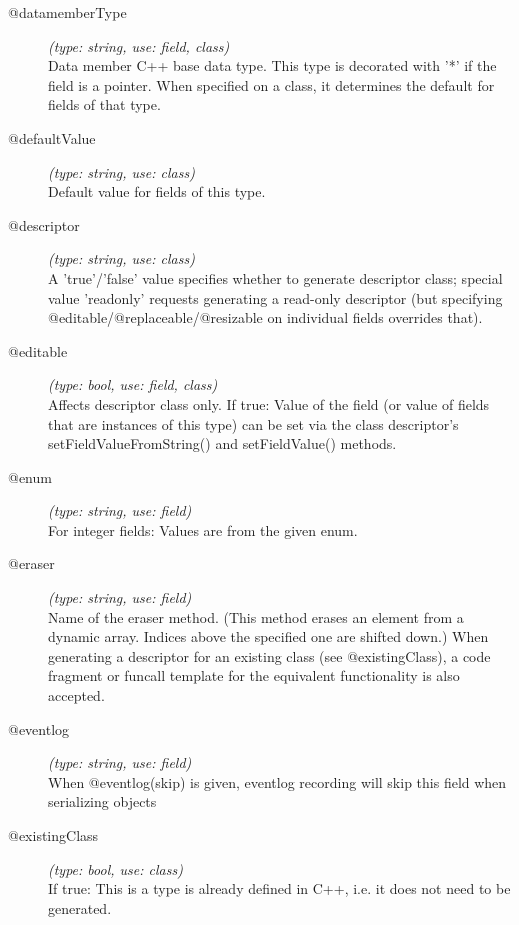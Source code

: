 \begin{description}
\item[@datamemberType] \textit{(type: string, use: field, class)} \\
  Data member C++ base data type. This type is decorated with '*' if the field
  is a pointer. When specified on a class, it determines the default for
  fields of that type.

\item[@defaultValue] \textit{(type: string, use: class)} \\
  Default value for fields of this type.

\item[@descriptor] \textit{(type: string, use: class)} \\
  A 'true'/'false' value specifies whether to generate descriptor class;
  special value 'readonly' requests generating a read-only descriptor (but
  specifying @editable/@replaceable/@resizable on individual fields overrides
  that).

\item[@editable] \textit{(type: bool, use: field, class)} \\
  Affects descriptor class only. If true: Value of the field (or value of
  fields that are instances of this type) can be set via the class
  descriptor's setFieldValueFromString() and setFieldValue() methods.

\item[@enum] \textit{(type: string, use: field)} \\
  For integer fields: Values are from the given enum.

\item[@eraser] \textit{(type: string, use: field)} \\
  Name of the eraser method. (This method erases an element from a dynamic
  array. Indices above the specified one are shifted down.) When generating a
  descriptor for an existing class (see @existingClass), a code fragment or
  funcall template for the equivalent functionality is also accepted.

\item[@eventlog] \textit{(type: string, use: field)} \\
  When @eventlog(skip) is given, eventlog recording will skip this field when
  serializing objects

\item[@existingClass] \textit{(type: bool, use: class)} \\
  If true: This is a type is already defined in C++, i.e. it does not need to
  be generated.


\end{description}
